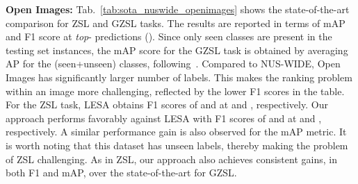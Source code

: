 \documentclass[10pt,journal,compsoc]{IEEEtran}
\begin{document}
\noindent\textbf{Open Images:} Tab.~\ref{tab:sota_nuswide_openimages} shows the state-of-the-art comparison for ZSL and GZSL tasks. The results are reported in terms of mAP and F1 score at \textit{top}- predictions (). Since only  seen classes are present in the testing set instances, the mAP score for the GZSL task is obtained by averaging AP for the  (seen+unseen) classes, following~\cite{openimages}. Compared to NUS-WIDE, Open Images has significantly larger number of labels. This makes the ranking problem within an image more challenging, reflected by the lower F1 scores in the table. For the ZSL task, LESA obtains F1 scores of  and  at  and , respectively. Our approach performs favorably against LESA with F1 scores of  and  at  and , respectively. A similar performance gain is also observed for the mAP metric.
It is worth noting that this dataset has  unseen labels, thereby making the problem of ZSL challenging. As in ZSL, our approach also achieves consistent gains, in both F1 and mAP, over the state-of-the-art for GZSL. 
\end{document}
